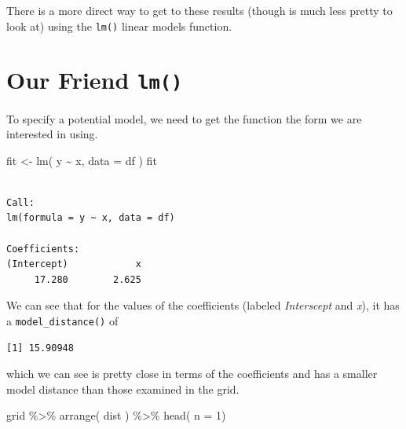 \documentclass[
  letterpaper,
]{book}
\newenvironment{Shaded}{\begin{snugshade}}{\end{snugshade}}
\newcommand{\AttributeTok}[1]{\textcolor[rgb]{0.40,0.45,0.13}{#1}}
\newcommand{\DecValTok}[1]{\textcolor[rgb]{0.68,0.00,0.00}{#1}}
\newcommand{\FloatTok}[1]{\textcolor[rgb]{0.68,0.00,0.00}{#1}}
\newcommand{\FunctionTok}[1]{\textcolor[rgb]{0.28,0.35,0.67}{#1}}
\newcommand{\NormalTok}[1]{\textcolor[rgb]{0.00,0.23,0.31}{#1}}
\newcommand{\OtherTok}[1]{\textcolor[rgb]{0.00,0.23,0.31}{#1}}
\newcommand{\SpecialCharTok}[1]{\textcolor[rgb]{0.37,0.37,0.37}{#1}}
\begin{document}
There is a more direct way to get to these results (though is much less
pretty to look at) using the \texttt{lm()} linear models function.

\section{\texorpdfstring{Our Friend
\texttt{lm()}}{Our Friend lm()}}\label{our-friend-lm}

To specify a potential model, we need to get the function the form we
are interested in using.

\begin{Shaded}
\begin{Highlighting}[]
\NormalTok{fit }\OtherTok{\textless{}{-}} \FunctionTok{lm}\NormalTok{( y }\SpecialCharTok{\textasciitilde{}}\NormalTok{ x, }\AttributeTok{data =}\NormalTok{ df )}
\NormalTok{fit}
\end{Highlighting}
\end{Shaded}

\begin{verbatim}

Call:
lm(formula = y ~ x, data = df)

Coefficients:
(Intercept)            x  
     17.280        2.625  
\end{verbatim}

We can see that for the values of the coefficients (labeled
\emph{Interscept} and \emph{x}), it has a \texttt{model\_distance()} of

\begin{Shaded}
\end{Shaded}

\begin{verbatim}
[1] 15.90948
\end{verbatim}

which we can see is pretty close in terms of the coefficients and has a
smaller model distance than those examined in the grid.

\begin{Shaded}
\begin{Highlighting}[]
\NormalTok{grid }\SpecialCharTok{\%\textgreater{}\%}
  \FunctionTok{arrange}\NormalTok{( dist ) }\SpecialCharTok{\%\textgreater{}\%}
  \FunctionTok{head}\NormalTok{( }\AttributeTok{n =} \DecValTok{1}\NormalTok{) }
\end{Highlighting}
\end{Shaded}
\end{document}
